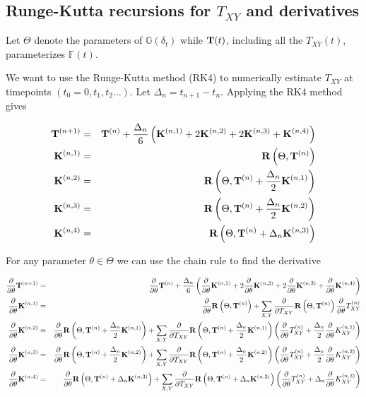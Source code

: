 \documentclass{article}
\begin{document}
\subsection{Runge-Kutta recursions for $T_{XY}$ and derivatives}

Let $\Theta$ denote the parameters of $\mathbb{G}(\delta_t)$
while ${\bf T}(t)$, including all the $T_{XY}(t)$, parameterizes $\mathbb{F}(t)$.

We want to use the Runge-Kutta method (RK4) to numerically estimate $T_{XY}$ at timepoints $(t_0=0, t_1, t_2 \ldots)$.
Let $\Delta_n = t_{n+1}-t_n$.
Applying the RK4 method gives

\begin{eqnarray*}
  {\bf T}^{(n+1)} & = & {\bf T}^{(n)} + \frac{\Delta_n}{6} \left( {\bf K}^{(n,1)} + 2{\bf K}^{(n,2)} + 2{\bf K}^{(n,3)} + {\bf K}^{(n,4)} \right) \\
  {\bf K}^{(n,1)} & = & {\bf R}\left(\Theta,{\bf T}^{(n)}\right) \\
  {\bf K}^{(n,2)} & = & {\bf R}\left(\Theta,{\bf T}^{(n)} + \frac{\Delta_n}{2} {\bf K}^{(n,1)}\right) \\
  {\bf K}^{(n,3)} & = & {\bf R}\left(\Theta,{\bf T}^{(n)} + \frac{\Delta_n}{2} {\bf K}^{(n,2)}\right) \\
  {\bf K}^{(n,4)} & = & {\bf R}\left(\Theta,{\bf T}^{(n)} + \Delta_n {\bf K}^{(n,3)}\right)
\end{eqnarray*}

For any parameter $\theta \in \Theta$ we can use the chain rule to find the derivative

\newcommand\ptheta{\frac{\partial}{\partial\theta}}
\newcommand\ptxy{\frac{\partial}{\partial T_{XY}}}
\newcommand\allpartials[1]{\ptheta #1 + \sum_{X,Y} \ptxy #1 \ptheta T_{XY}^{(n)}}
\newcommand\allpartialsk[3]{\ptheta #1 + \sum_{X,Y} \ptxy #1 \left( \ptheta T_{XY}^{(n)} + #2 \ptheta K_{XY}^{(n,#3)} \right)}
\begin{eqnarray*}
  \ptheta {\bf T}^{(n+1)} & = & \ptheta {\bf T}^{(n)} + \frac{\Delta_n}{6} \left( \ptheta {\bf K}^{(n,1)} + 2\ptheta{\bf K}^{(n,2)} + 2\ptheta{\bf K}^{(n,3)} + \ptheta{\bf K}^{(n,4)} \right) \\
  \ptheta {\bf K}^{(n,1)} & = & \allpartials{{\bf R}\left(\Theta,{\bf T}^{(n)}\right)} \\
  \ptheta {\bf K}^{(n,2)} & = & \allpartialsk{{\bf R}\left(\Theta,{\bf T}^{(n)} + \frac{\Delta_n}{2} {\bf K}^{(n,1)}\right)}{\frac{\Delta_n}{2}}{1} \\
  \ptheta {\bf K}^{(n,3)} & = & \allpartialsk{{\bf R}\left(\Theta,{\bf T}^{(n)} + \frac{\Delta_n}{2} {\bf K}^{(n,2)}\right)}{\frac{\Delta_n}{2}}{2} \\
  \ptheta {\bf K}^{(n,4)} & = & \allpartialsk{{\bf R}\left(\Theta,{\bf T}^{(n)} + \Delta_n {\bf K}^{(n,3)}\right)}{\Delta_n}{3}
\end{eqnarray*}
\end{document}
